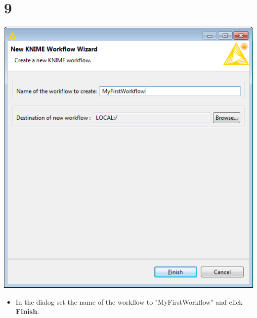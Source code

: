 \documentclass[10pt]{beamer}
\begin{document}
\section{9}
\begin{frame}
	\begin{center}
  		\includegraphics[height=0.6\textheight]{9.png}
	\end{center}
	\begin{itemize}
		\item In the dialog set the name of the workflow to "MyFirstWorkflow" and click \textbf{Finish}.
	\end{itemize}
\end{frame}
\end{document}
